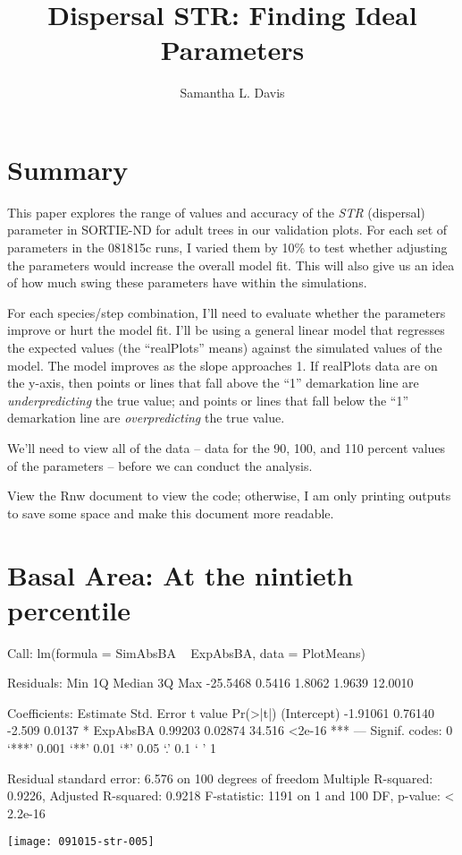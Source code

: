 \documentclass{article}
\begin{document}


\title{Dispersal STR: Finding Ideal Parameters}
\author{Samantha L. Davis}

\maketitle

\section{Summary}
This paper explores the range of values and accuracy of the \textit{STR} (dispersal) parameter in SORTIE-ND for adult trees in our validation plots. For each set of parameters in the 081815c runs, I varied them by 10\% to test whether adjusting the parameters would increase the overall model fit. This will also give us an idea of how much swing these parameters have within the simulations. 

For each species/step combination, I'll need to evaluate whether the parameters improve or hurt the model fit. I'll be using a general linear model that regresses the expected values (the ``realPlots'' means) against the simulated values of the model. The model improves as the slope approaches 1. If realPlots data are on the y-axis, then points or lines that fall above the ``1'' demarkation line are \textit{underpredicting} the true value; and points or lines that fall below the ``1'' demarkation line are \textit{overpredicting} the true value.

We'll need to view all of the data -- data for the 90, 100, and 110 percent values of the parameters -- before we can conduct the analysis. 

View the Rnw document to view the code; otherwise, I am only printing outputs to save some space and make this document more readable.







\newpage

\section{Basal Area: At the nintieth percentile}
\begin{Schunk}
\begin{Soutput}
Call:
lm(formula = SimAbsBA ~ ExpAbsBA, data = PlotMeans)

Residuals:
     Min       1Q   Median       3Q      Max 
-25.5468   0.5416   1.8062   1.9639  12.0010 

Coefficients:
            Estimate Std. Error t value Pr(>|t|)    
(Intercept) -1.91061    0.76140  -2.509   0.0137 *  
ExpAbsBA     0.99203    0.02874  34.516   <2e-16 ***
---
Signif. codes:  0 ‘***’ 0.001 ‘**’ 0.01 ‘*’ 0.05 ‘.’ 0.1 ‘ ’ 1

Residual standard error: 6.576 on 100 degrees of freedom
Multiple R-squared:  0.9226,	Adjusted R-squared:  0.9218 
F-statistic:  1191 on 1 and 100 DF,  p-value: < 2.2e-16
\end{Soutput}
\end{Schunk}
\texttt{[image: 091015-str-005]}
\end{document}

